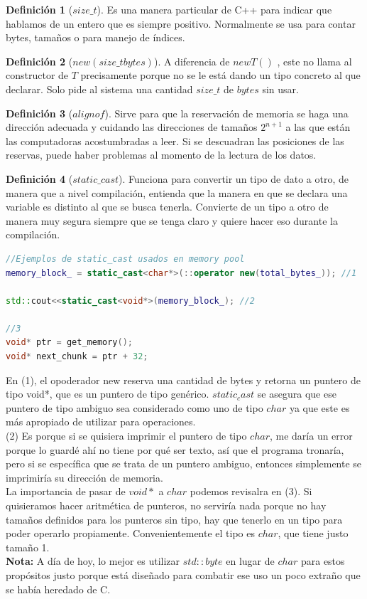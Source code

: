 \documentclass[11pt,a4paper,oneside]{report}
\theoremstyle{definition}
\newtheorem{definicion}{Definición}[chapter]
\theoremstyle{plain}
\theoremstyle{remark}
\begin{document}
\begin{definicion}[$size\_t$]
  Es una manera particular de C++ para indicar que hablamos de un entero que es siempre positivo. Normalmente se usa para 
  contar bytes, tamaños o para manejo de índices.
\end{definicion}

\begin{definicion}[$new(size\_t bytes)$]
  A diferencia de $new T()$ , este no llama al constructor de $T$ precisamente porque no se le está dando un tipo concreto 
  al que declarar. Solo pide al sistema una cantidad $size\_t$ de $bytes$ sin usar.
\end{definicion}

\begin{definicion}[$alignof$]
  Sirve para que la reservación de memoria se haga una dirección adecuada y cuidando las direcciones de tamaños $2^{n+1}$ 
  a las que están las computadoras acostumbradas a leer. Si se descuadran las posiciones de las reservas, puede haber
  problemas al momento de la lectura de los datos. 
\end{definicion}

\begin{definicion}[$static\_cast$]
  Funciona para convertir un tipo de dato a otro, de manera que a nivel compilación, entienda que la manera en que 
  se declara una variable es distinto al que se busca tenerla. Convierte de un tipo a otro de manera muy segura siempre
  que se tenga claro y quiere hacer eso durante la compilación.
\end{definicion}

\begin{lstlisting}[language=C++, caption={static\_cast}]
//Ejemplos de static_cast usados en memory pool
memory_block_ = static_cast<char*>(::operator new(total_bytes_)); //1

std::cout<<static_cast<void*>(memory_block_); //2

//3
void* ptr = get_memory();
void* next_chunk = ptr + 32;
\end{lstlisting}

En (1), el opoderador new reserva una cantidad de bytes y retorna un puntero de tipo void*,
que es un puntero de tipo genérico. $static_cast$ se asegura que ese puntero de tipo ambiguo 
sea considerado como uno de tipo $char$ ya que este es más apropiado de utilizar para operaciones.\\
(2) Es porque si se quisiera imprimir el puntero de tipo $char$, me daría un error porque lo guardé ahí
no tiene por qué ser texto, así que el programa tronaría, pero si se específica que se trata de un puntero 
ambiguo, entonces simplemente se imprimiría su dirección de memoria.\\
La importancia de pasar de $void*$ a $char$ podemos revisalra en (3). Si quisieramos hacer aritmética de punteros,
no serviría nada porque no hay tamaños definidos para los punteros sin tipo, hay que tenerlo en un tipo para poder
operarlo propiamente. Convenientemente el tipo es $char$, que tiene justo tamaño 1.\\
\textbf{Nota:} A día de hoy, lo mejor es utilizar $std::byte$ en lugar de $char$ para estos propósitos justo porque
está diseñado para combatir ese uso un poco extraño que se había heredado de C.
\printindex
\end{document}
